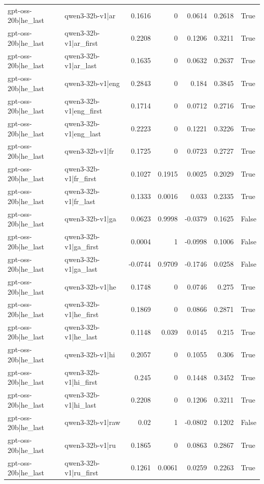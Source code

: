 \begin{table}
\begin{tabular}{l l r r r r l}
gpt-oss-20b|he_last & qwen3-32b-v1|ar & 0.1616 & 0 & 0.0614 & 0.2618 & True \\
gpt-oss-20b|he_last & qwen3-32b-v1|ar_first & 0.2208 & 0 & 0.1206 & 0.3211 & True \\
gpt-oss-20b|he_last & qwen3-32b-v1|ar_last & 0.1635 & 0 & 0.0632 & 0.2637 & True \\
gpt-oss-20b|he_last & qwen3-32b-v1|eng & 0.2843 & 0 & 0.184 & 0.3845 & True \\
gpt-oss-20b|he_last & qwen3-32b-v1|eng_first & 0.1714 & 0 & 0.0712 & 0.2716 & True \\
gpt-oss-20b|he_last & qwen3-32b-v1|eng_last & 0.2223 & 0 & 0.1221 & 0.3226 & True \\
gpt-oss-20b|he_last & qwen3-32b-v1|fr & 0.1725 & 0 & 0.0723 & 0.2727 & True \\
gpt-oss-20b|he_last & qwen3-32b-v1|fr_first & 0.1027 & 0.1915 & 0.0025 & 0.2029 & True \\
gpt-oss-20b|he_last & qwen3-32b-v1|fr_last & 0.1333 & 0.0016 & 0.033 & 0.2335 & True \\
gpt-oss-20b|he_last & qwen3-32b-v1|ga & 0.0623 & 0.9998 & -0.0379 & 0.1625 & False \\
gpt-oss-20b|he_last & qwen3-32b-v1|ga_first & 0.0004 & 1 & -0.0998 & 0.1006 & False \\
gpt-oss-20b|he_last & qwen3-32b-v1|ga_last & -0.0744 & 0.9709 & -0.1746 & 0.0258 & False \\
gpt-oss-20b|he_last & qwen3-32b-v1|he & 0.1748 & 0 & 0.0746 & 0.275 & True \\
gpt-oss-20b|he_last & qwen3-32b-v1|he_first & 0.1869 & 0 & 0.0866 & 0.2871 & True \\
gpt-oss-20b|he_last & qwen3-32b-v1|he_last & 0.1148 & 0.039 & 0.0145 & 0.215 & True \\
gpt-oss-20b|he_last & qwen3-32b-v1|hi & 0.2057 & 0 & 0.1055 & 0.306 & True \\
gpt-oss-20b|he_last & qwen3-32b-v1|hi_first & 0.245 & 0 & 0.1448 & 0.3452 & True \\
gpt-oss-20b|he_last & qwen3-32b-v1|hi_last & 0.2208 & 0 & 0.1206 & 0.3211 & True \\
gpt-oss-20b|he_last & qwen3-32b-v1|raw & 0.02 & 1 & -0.0802 & 0.1202 & False \\
gpt-oss-20b|he_last & qwen3-32b-v1|ru & 0.1865 & 0 & 0.0863 & 0.2867 & True \\
gpt-oss-20b|he_last & qwen3-32b-v1|ru_first & 0.1261 & 0.0061 & 0.0259 & 0.2263 & True \\

\end{tabular}
\end{table}
